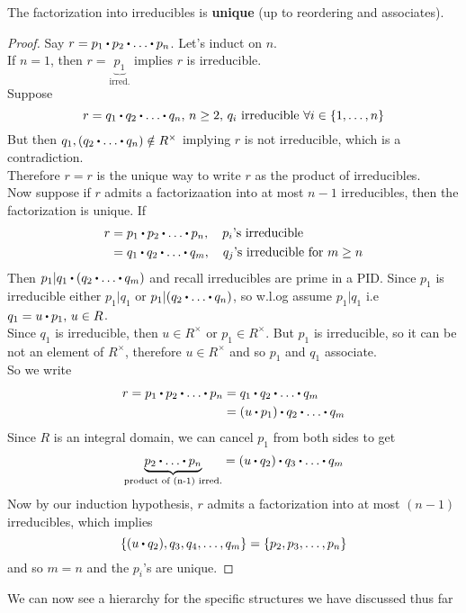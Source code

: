 \documentclass[../Main.tex]{subfiles}
\begin{document}
\begin{lem}
	The factorization into irreducibles is \textbf{unique} (up to reordering and associates).
\end{lem}
\begin{proof}
	Say $r=p_1\rdot p_2\rdot \dots\rdot p_n$. Let's induct on $n$.\\
	If $n=1$, then $r=\underbrace{p_1}_{\text{irred.}}$ implies $r$ is irreducible.\\
	Suppose
	\[r=q_1\rdot q_2\rdot \dots\rdot q_n,\, n\ge 2,\, q_i \text{ irreducible } \forall i\in \{1,\dots,n\}\]
	But then $q_1,(q_2\rdot \dots\rdot  q_n) \notin R^\times$ implying $r$ is not irreducible, which is a contradiction.\\
	Therefore $r=r$ is the unique way to write $r$ as the product of irreducibles.\\
	Now suppose if $r$ admits a factorizaation into at most $n-1$ irreducibles, then the factorization is unique.
	If
	\begin{align*}
	r&=p_1\rdot p_2\rdot \dots \rdot p_n, \quad p_i\text{'s irreducible}\\
	&=q_1\rdot q_2\rdot \dots\rdot q_m,\quad q_j\text{'s irreducible for } m\ge n
	\end{align*}
	Then $p_1| q_1 \rdot (q_2\rdot \dots\rdot  q_m)$ and recall irreducibles are prime in a PID. Since $p_1$ is irreducible either $p_1| q_1$ or $p_1 | (q_2\rdot \dots\rdot  q_n)$, so w.l.og assume $p_1| q_1$ i.e $q_1=u\rdot p_1,\, u\in R$.\\
	Since $q_1$ is irreducible, then $u\in R^\times $ or $p_1 \in R^\times$. But $p_1$ is irreducible, so it can be not an element of $R^\times$, therefore $u\in R^\times$ and so $p_1$ and $q_1$ associate.\\
	So we write
	\begin{align*}r=p_1\rdot p_2\rdot \dots \rdot p_n&= q_1\rdot q_2 \rdot  \dots \rdot q_m\\
	&=(u\rdot p_1)\rdot q_2\rdot \dots \rdot q_m \end{align*}
	Since $R$ is an integral domain, we can cancel $p_1$ from both sides to get
	\[\underbrace{p_2\rdot \dots \rdot p_n}_{\text{product of (n-1) irred.}} =(u\rdot q_2)\rdot q_3\rdot \dots \rdot q_m \]
	Now by our induction hypothesis, $r$ admits a factorization into at most $(n-1)$ irreducibles, which implies
	\[\{(u\rdot q_2),q_3,q_4,\dots,q_m\}=\{p_2,p_3,\dots,p_n\}\]
	and so $m=n$ and the $p_i$'s are unique.
\end{proof}
We can now see a hierarchy for the specific structures we have discussed thus far
\end{document}
